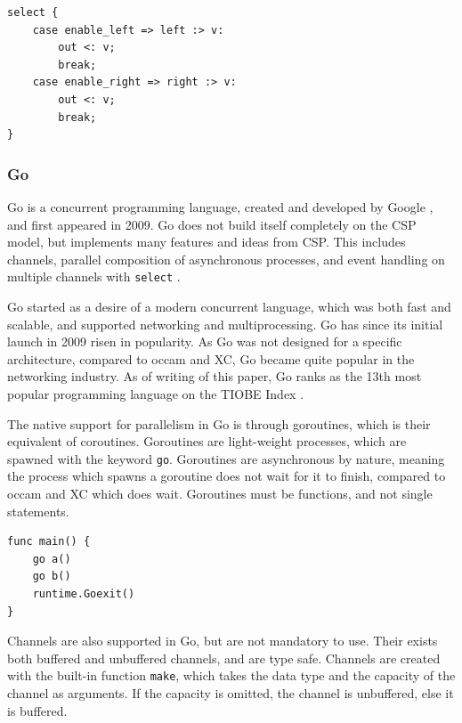 \noindent\begin{minipage}{\textwidth}
\begin{lstlisting}[style={CustomC},frame={},numbers={none},xleftmargin={4em}]
select {
    case enable_left => left :> v:
        out <: v;
        break;
    case enable_right => right :> v:
        out <: v;
        break;
}
\end{lstlisting}
\end{minipage}


\subsubsection{Go}
\label{sssec:go}

Go is a concurrent programming language, created and developed by Google \citep{golangintro}, and first appeared in 2009. Go does not build itself completely on the CSP model, but implements many features and ideas from CSP. This includes channels, parallel composition of asynchronous processes, and event handling on multiple channels with \texttt{select} \citep{golangspec}.

Go started as a desire of a modern concurrent language, which was both fast and scalable, and supported networking and multiprocessing. Go has since its initial launch in 2009 risen in popularity. As Go was not designed for a specific architecture, compared to occam and XC, Go became quite popular in the networking industry. As of writing of this paper, Go ranks as the 13th most popular programming language on the TIOBE Index \citep{gopopularity}.

The native support for parallelism in Go is through goroutines, which is their equivalent of coroutines. Goroutines are light\hyp{}weight processes, which are spawned with the keyword \texttt{go}. Goroutines are asynchronous by nature, meaning the process which spawns a goroutine does not wait for it to finish, compared to occam and XC which does wait. Goroutines must be functions, and not single statements.

\noindent\begin{minipage}{\textwidth}
\begin{lstlisting}[style={CustomGo},frame={},numbers={none},xleftmargin={4em}]
func main() {
    go a()
    go b()
    runtime.Goexit()
}
\end{lstlisting}
\end{minipage}

Channels are also supported in Go, but are not mandatory to use. Their exists both buffered and unbuffered channels, and are type safe. Channels are created with the built\hyp{}in function \texttt{make}, which takes the data type and the capacity of the channel as arguments. If the capacity is omitted, the channel is unbuffered, else it is buffered.

